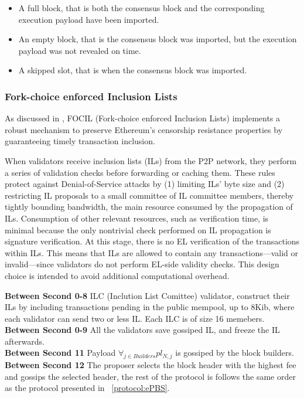 \begin{itemize}
    \item A full block, that is both the consensus block and the corresponding execution payload have been imported.
    \item An empty block, that is the consensus block was imported, but the execution payload was not revealed on time.
    \item A skipped slot, that is when the consensus block was imported.
\end{itemize}

\subsubsection{Fork-choice enforced Inclusion Lists}
\label{subsubsec:focil}
As discussed in \cite{eip_7805_focil}, FOCIL (Fork-choice enforced Inclusion Lists) implements a robust mechanism to preserve Ethereum’s censorship resistance properties by guaranteeing timely transaction inclusion. 

When validators receive inclusion lists (ILs) from the P2P network, they perform a series of validation checks before forwarding or caching them. These rules protect against Denial-of-Service attacks by (1) limiting ILs’ byte size and (2) restricting IL proposals to a small committee of IL committee members, thereby tightly bounding bandwidth, the main resource consumed by the propagation of ILs. Consumption of other relevant resources, such as verification time, is minimal because the only nontrivial check performed on IL propagation is signature verification. At this stage, there is no EL verification of the transactions within ILs. This means that ILs are allowed to contain any transactions—valid or invalid—since validators do not perform EL-side validity checks. This design choice is intended to avoid additional computational overhead.



\noindent\textbf{Between Second 0-8} ILC (Inclution List Comittee) validator, construct their ILs by including transactions pending in the public mempool, up to 8Kib, where each validator can send two or less IL. Each ILC is of size 16 memebers. 
\\[8pt]
\noindent\textbf{Between Second 0-9} All the validators save gossiped IL, and freeze the IL afterwards.
\\[8pt]
\noindent\textbf{Between Second 11} Payload $\forall_{j \in Builders} pl_{N,j}$ is gossiped by the block builders.
\\[8pt]
\noindent\textbf{Between Second 12} The proposer selects the block header with the highest fee and gossips the selected header, the rest of the protocol is follows the same order as the protocol presented in ~\ref{protocol:ePBS}.
